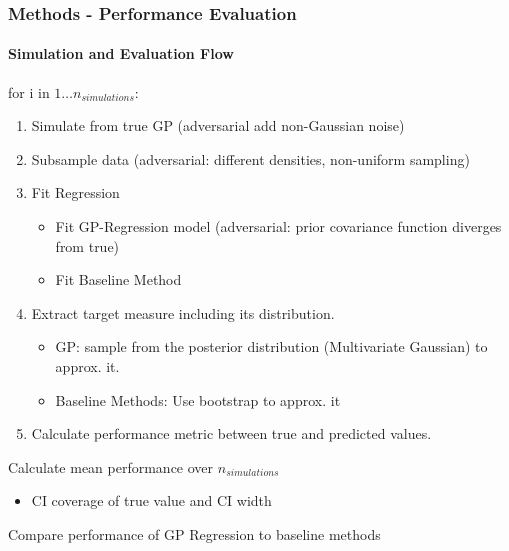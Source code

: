 \documentclass[
	8pt, %
]{beamer}
\begin{document}
\begin{frame}
	\frametitle{Methods - Performance Evaluation}
	\framesubtitle{Simulation and Evaluation Flow}
		for i in $1 \dots n_{simulations}$:
		\begin{enumerate}
			\item Simulate from true GP (adversarial add non-Gaussian noise)
			\item Subsample data (adversarial: different densities, non-uniform sampling)
			\item Fit Regression
			\begin{itemize}
				\item Fit GP-Regression model (adversarial: prior covariance function diverges from true)
				\item Fit Baseline Method
			\end{itemize}
			\item Extract target measure including its distribution.
				\begin{itemize}
					\item GP: sample from the posterior distribution (Multivariate Gaussian) to approx. it.
					\item Baseline Methods: Use bootstrap to approx. it
				\end{itemize}
			\item Calculate performance metric between true and predicted values.
		\end{enumerate}

	\bigskip
	Calculate mean performance over $n_{simulations}$
		\begin{itemize}
			\item CI coverage of true value and CI width
		\end{itemize}

	\bigskip

	Compare performance of GP Regression to baseline methods

\end{frame}
%
\end{document}
